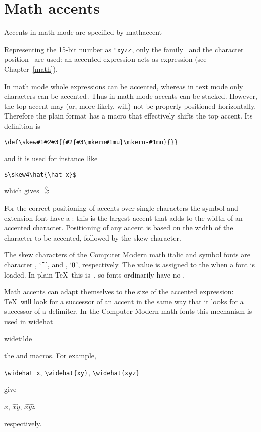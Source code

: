 \section{Math accents}

Accents in math mode are specified by
\cstoidx mathaccent\par
\begin{disp}\end{disp}
Representing the 15-bit number as \verb>"xyzz>,
only the family~ and the character position~
are used: an accented expression acts as  expression
(see Chapter~\ref{math}).

In math mode whole expressions can be accented,
\alt
whereas in text mode only characters can be accented.
Thus in math mode accents can be stacked. However, the top
accent may (or, more likely, will) not be properly positioned
horizontally. Therefore the plain format has a macro 
that effectively shifts the top accent. Its definition is
\begin{verbatim}
\def\skew#1#2#3{{#2{#3\mkern#1mu}\mkern-#1mu}{}}
\end{verbatim}
and it is used for instance like
\begin{verbatim}
$\skew4\hat{\hat x}$
\end{verbatim}
which gives~{$\skew4\hat{\hat x}$}.

For the correct positioning of accents over single characters
the symbol and extension font have a :
this is the largest accent that adds to the width of an
accented character. Positioning of any accent
is based on the width of the character to be accented,
followed by the skew character. 

The skew characters of the Computer Modern
math italic and symbol fonts are character ,
\alt
`$\mathchar"7F$',
and , `$\mathchar"30$', respectively. The 
value is assigned to the  when a font is loaded.
In plain \TeX\ this is~, so fonts ordinarily have no
.

Math accents can adapt themselves to the size of the accented
expression: \TeX\ will look for a successor of an accent
in the same way that it looks for a successor of a delimiter.
In the Computer Modern math fonts this mechanism is used in
\cstoidx widehat\par\cstoidx widetilde\par
the  and  macros.
For example,
\begin{disp}\verb>\widehat x>, \verb>\widehat{xy}>, \verb>\widehat{xyz}>
\end{disp} give
\begin{disp}$\widehat x$, $\widehat{xy}$, $\widehat{xyz}$
\end{disp} respectively.

\endofchapter
